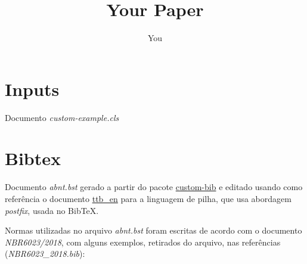 \documentclass{article}
\title{Your Paper}
\author{You}
\begin{document}
\maketitle

\section{Inputs}
Documento \textit{custom-example.cls}

\section{Bibtex}
Documento \textit{abnt.bst} gerado a partir do pacote \href{https://ctan.org/pkg/custom-bib}{custom-bib} e editado usando como referência o documento \href{https://linorg.usp.br/CTAN/info/bibtex/tamethebeast/ttb_en.pdf}{ttb\_en} para a linguagem de pilha, que usa abordagem \textit{postfix}, usada no BibTeX.

Normas utilizadas no arquivo \textit{abnt.bst} foram escritas de acordo com o documento \textit{NBR6023/2018}, com alguns exemplos, retirados do arquivo, nas referências (\textit{NBR6023\_2018.bib}):
\cite{7.1.1.exemplo1} \cite{7.1.1.exemplo2} \cite{7.1.1.exemplo3} \cite{7.1.2.exemplo1} \cite{7.1.2.exemplo2} \cite{7.1.2.exemplo3}
\cite{7.2.exemplo1} \cite{7.2.exemplo2} \cite{7.2.exemplo3} \cite{7.2.exemplo4} \cite{7.2.exemplo5} \cite{7.2.exemplo6} \cite{7.2.exemplo7}
\cite{7.3.exemplo1}
\cite{7.7.1.exemplo1} \cite{7.7.1.exemplo2} \cite{7.7.1.exemplo3} \cite{7.7.2exemplo1} \cite{7.7.2exemplo2} \cite{7.7.4.exemplo1} \cite{7.7.4.exemplo2} \cite{7.7.4.exemplo3}
\cite{7.7.5.exemplo1} \cite{7.7.5.exemplo2} \cite{7.7.5.exemplo3} \cite{7.7.5.exemplo4} \cite{7.7.6.exemplo1} \cite{7.7.6.exemplo2} \cite{7.7.6.exemplo3} \cite{7.7.7.exemplo1} \cite{7.7.7.exemplo2}
\cite{7.8.1.exemplo1} \cite{7.8.4.exemplo1}



\end{document}
